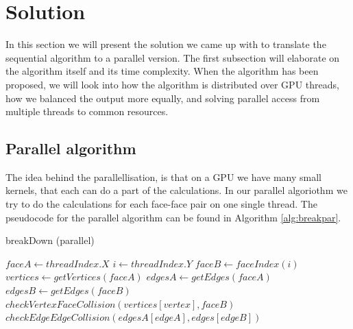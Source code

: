 \section{Solution}
In this section we will present the solution we came up with to translate the sequential algorithm to a parallel version. The first subsection will elaborate on the algorithm itself and its time complexity. When the algorithm has been proposed, we will look into how the algorithm is distributed over GPU threads, how we balanced the output more equally, and solving parallel access from multiple threads to common resources.

\subsection{Parallel algorithm}
The idea behind the parallellisation, is that on a GPU we have many small kernels, that each can do a part of the calculations. In our parallel algoriothm we try to do the calculations for each face-face pair on one single thread. The pseudocode for the parallel algorithm can be found in Algorithm \ref{alg:breakpar}.

\begin{algorithm}
\caption{breakDown (parallel)}\label{alg:breakpar}
\begin{algorithmic}[1]
    \State $faceA \gets threadIndex.X$
    \State $i \gets threadIndex.Y$
    \State $faceB \gets faceIndex(i)$ 
    \State $vertices \gets getVertices(faceA)$
    \State $edgesA \gets getEdges(faceA)$
    \State $edgesB \gets getEdges(faceB)$
            \State $checkVertexFaceCollision(vertices[vertex], faceB)$
        \EndFor
                    \State $checkEdgeEdgeCollision(edgesA[edgeA], edges[edgeB])$
                \EndIf
            \EndFor
        \EndFor
\EndProcedure
\end{algorithmic}
\end{algorithm}

